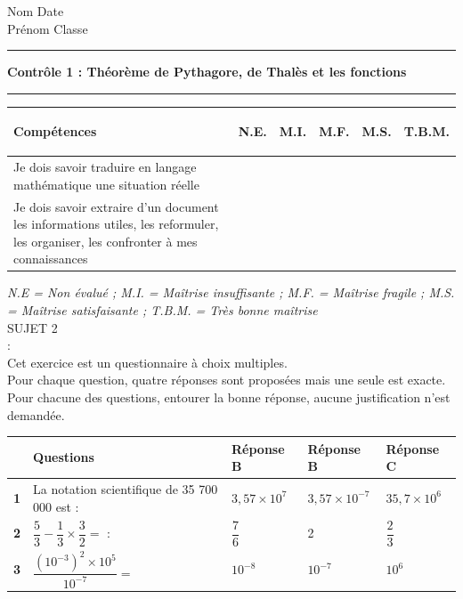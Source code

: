 \documentclass[a4paper,11pt]{article}
\newcounter{numexo}
\newcommand{\exo}[1]{\stepcounter{numexo}\noindent{\bf Exercice~\thenumexo} : \marginpar{\hfill /#1}}
\newcommand{\titre}[5] 
{
\noindent #2 \hfill #4 \\
#3 \hfill #5

\vspace{-1.6cm}

\begin{center}\rule{6cm}{0.5mm}\end{center}
\vspace{0.2cm}
\begin{center}{\large{\textbf{#1}}}\end{center}
\begin{center}\rule{6cm}{0.5mm}\end{center}
}
\begin{document}
\pagestyle{empty}
\titre{Contrôle 1 : Théorème de Pythagore, de Thalès et les fonctions }{Nom}{Prénom}{Date}{Classe}

\begin{flushleft}
\begin{tabular}{|m{9.5cm}|m{1.25cm}|m{1.25cm}|m{1.25cm}|m{1.25cm}|m{1.25cm}|}
\hline 
\textbf{Compétences} & \begin{center}
\textbf{N.E.}
\end{center} & \begin{center}
\textbf{M.I.}
\end{center} & \begin{center}
\textbf{M.F.}
\end{center}  & \begin{center}
\textbf{M.S.}
\end{center} & \begin{center}
\textbf{T.B.M.}
\end{center} \\ 
\hline 
Je dois savoir traduire en langage mathématique une situation réelle &  &  & & &\\
\hline 
Je dois savoir extraire d'un document les informations utiles, les reformuler, les organiser, les confronter à mes connaissances &  &  & & &\\
\hline
\end{tabular} 
\end{flushleft}

\textit{N.E = Non évalué ; M.I. = Maîtrise insuffisante ; M.F. = Maîtrise fragile ; M.S. = Maîtrise satisfaisante ; T.B.M. = Très bonne maîtrise}\\


\vspace*{0.25cm}
SUJET 2\\

\vspace*{0.25cm}
\exo{3} \\
Cet exercice est un questionnaire à choix multiples.\\
Pour chaque question, quatre réponses sont proposées mais une seule est exacte. Pour chacune des questions, entourer la bonne réponse, aucune justification n'est demandée.\\

\vspace*{0.25cm}

\renewcommand{\arraystretch}
{3.2}

\begin{tabular}{|c|p{9cm}|p{2.5cm}|p{2.35cm}|p{2.35cm}|}
\hline 
 & \textbf{Questions} & \textbf{Réponse B} & \textbf{Réponse B} & \textbf{Réponse C} \\ 
\hline 
\textbf{1} & La notation scientifique de 35 700 000 est : & $3,57 \times 10^{7}$ & $3,57 \times 10^{-7}$ & $35,7 \times 10^{6}$ \\
\hline 
\textbf{2} & $\dfrac{5}{3}-\dfrac{1}{3} \times \dfrac{3}{2}=$  : & $\dfrac{7}{6}$ & 2  & $\dfrac{2}{3}$ \\ 
\hline 
\textbf{3 }& $\dfrac{(10^{-3})^{2} \times 10^{5}}{10^{-7}}=$ & $10^{-8}$  & $10^{-7}$  & $10^{6}$   \\ 
\hline 
\end{tabular} 
\end{document}

